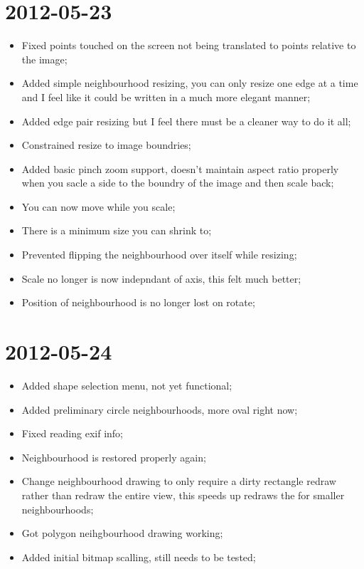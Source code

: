 \documentclass{report}
\begin{document}
\section*{2012-05-23}
\begin{itemize}
  \item 
    Fixed points touched on the screen not being translated to points relative to the image;
  \item
    Added simple neighbourhood resizing, you can only resize one edge at a time and I feel like it could be written in a much more elegant manner;
  \item
    Added edge pair resizing but I feel there must be a cleaner way to do it all;
  \item
    Constrained resize to image boundries;
  \item
    Added basic pinch zoom support, doesn't maintain aspect ratio properly when you sacle a side to the boundry of the image and then scale back;
  \item
    You can now move while you scale; 
  \item
    There is a minimum size you can shrink to;
  \item
    Prevented flipping the neighbourhood over itself while resizing;
  \item
    Scale no longer is now indepndant of axis, this felt much better;
  \item
    Position of neighbourhood is no longer lost on rotate;
\end{itemize}

\section*{2012-05-24}
\begin{itemize}
  \item 
    Added shape selection menu, not yet functional;
  \item
    Added preliminary circle neighbourhoods, more oval right now;
  \item
    Fixed reading exif info;
  \item
    Neighbourhood is restored properly again;
  \item
    Change neighbourhood drawing to only require a dirty rectangle redraw rather than redraw the entire view, this speeds up redraws the for smaller neighbourhoods;
  \item
    Got polygon neihgbourhood drawing working;
  \item
    Added initial bitmap scalling, still needs to be tested;
\end{itemize}
\end{document}
